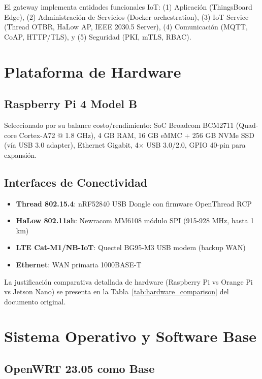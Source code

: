 El gateway implementa entidades funcionales IoT: (1) Aplicación (ThingsBoard Edge), (2) Administración de Servicios (Docker orchestration), (3) IoT Service (Thread OTBR, HaLow AP, IEEE 2030.5 Server), (4) Comunicación (MQTT, CoAP, HTTP/TLS), y (5) Seguridad (PKI, mTLS, RBAC).

\section{Plataforma de Hardware}

\subsection{Raspberry Pi 4 Model B}

Seleccionado por su balance costo/rendimiento: SoC Broadcom BCM2711 (Quad-core Cortex-A72 @ 1.8 GHz), 4 GB RAM, 16 GB eMMC + 256 GB NVMe SSD (vía USB 3.0 adapter), Ethernet Gigabit, 4$\times$ USB 3.0/2.0, GPIO 40-pin para expansión.

\subsection{Interfaces de Conectividad}

\begin{itemize}
    \item \textbf{Thread 802.15.4}: nRF52840 USB Dongle con firmware OpenThread RCP
    \item \textbf{HaLow 802.11ah}: Newracom MM6108 módulo SPI (915-928 MHz, hasta 1 km)
    \item \textbf{LTE Cat-M1/NB-IoT}: Quectel BG95-M3 USB modem (backup WAN)
    \item \textbf{Ethernet}: WAN primaria 1000BASE-T
\end{itemize}

La justificación comparativa detallada de hardware (Raspberry Pi vs Orange Pi vs Jetson Nano) se presenta en la Tabla~\ref{tab:hardware_comparison} del documento original.

\section{Sistema Operativo y Software Base}

\subsection{OpenWRT 23.05 como Base}

